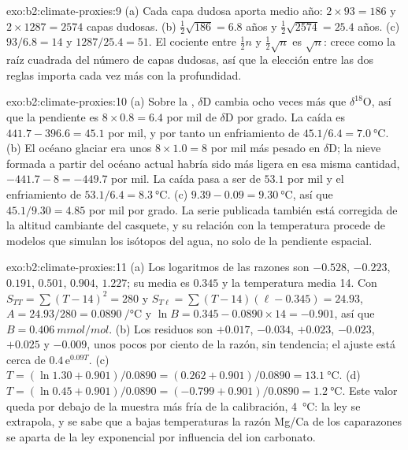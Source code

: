 \begin{solution}{exo:b2:climate-proxies:9}
(a) Cada capa dudosa aporta medio año: $2 \times 93 = 186$ y $2 \times 1287 = 2574$
capas dudosas. (b) $\frac12\sqrt{186} = 6.8$ años y $\frac12\sqrt{2574} = 25.4$ años.
(c) $93/6.8 = 14$ y $1287/25.4 = 51$. El cociente entre $\frac12 n$ y $\frac12\sqrt{n}$ es
$\sqrt{n}$: crece como la raíz cuadrada del número de capas dudosas, así que la elección entre
las dos reglas importa cada vez más con la profundidad.
\end{solution}

\begin{solution}{exo:b2:climate-proxies:10}
(a) Sobre la , $\delta$D cambia ocho veces más que $\delta^{18}$O, así que la
pendiente es $8 \times 0.8 = 6.4$ por mil de $\delta$D por grado. La caída es $441.7 - 396.6 = 45.1$
por mil, y por tanto un enfriamiento de $45.1/6.4 = \qty{7.0}{\celsius}$. (b) El océano glaciar era unos
$8 \times 1.0 = 8$ por mil más pesado en $\delta$D; la nieve formada a partir del océano actual habría sido
más ligera en esa misma cantidad, $-441.7 - 8 = -449.7$ por mil. La caída pasa a ser de $53.1$ por mil y el enfriamiento
de $53.1/6.4 = \qty{8.3}{\celsius}$. (c) $9.39 - 0.09 = \qty{9.30}{\celsius}$, así que $45.1/9.30 = 4.85$
por mil por grado. La serie publicada también está corregida de la altitud cambiante del
casquete, y su relación con la temperatura procede de modelos que simulan los isótopos del agua, no solo de
la pendiente espacial.
\end{solution}

\begin{solution}{exo:b2:climate-proxies:11}
(a) Los logaritmos de las razones son $-0.528$, $-0.223$, $0.191$, $0.501$, $0.904$, $1.227$; su
media es $0.345$ y la temperatura media 14. Con $S_{TT} = \sum (T - 14)^2 = 280$ y $S_{T\ell} =
\sum (T - 14)(\ell - 0.345) = 24.93$, $A = 24.93/280 = \qty{0.0890}{\per\celsius}$ y $\ln B =
0.345 - 0.0890 \times 14 = -0.901$, así que $B = \qty{0.406}{mmol/mol}$. (b) Los residuos son
$+0.017$, $-0.034$, $+0.023$, $-0.023$, $+0.025$ y $-0.009$, unos pocos por ciento de la razón, sin
tendencia; el ajuste está cerca de $0.4\,\mathrm{e}^{0.09T}$. (c) $T = (\ln 1.30 + 0.901)/0.0890 = (0.262 +
0.901)/0.0890 = \qty{13.1}{\celsius}$. (d) $T = (\ln 0.45 + 0.901)/0.0890 = (-0.799 +
0.901)/0.0890 = \qty{1.2}{\celsius}$. Este valor queda por debajo de la muestra más fría de la calibración,
\qty{4}{\celsius}: la ley se extrapola, y se sabe que a bajas temperaturas la razón Mg/Ca de los caparazones
se aparta de la ley exponencial por influencia del ion carbonato.
\end{solution}

